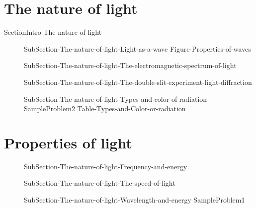 \documentclass[main.tex]{subfiles}
\begin{document}
 
 
\section{The nature of light}{SectionIntro-The-nature-of-light}
\sloppy\begin{description}
\item[]{SubSection-The-nature-of-light-Light-as-a-wave}
{Figure-Properties-of-waves}
\item[]{SubSection-The-nature-of-light-The-electromagnetic-spectrum-of-light}
\vspace{-1cm}{Figure-Electromagnetic-field}
\item[] {SubSection-The-nature-of-light-The-double-slit-experiment-light-diffraction}
\vspace{-1cm}{Figure-Double-slit}
\vspace{0cm}\hspace{-5cm}{Figure-waves-and-life}
\item[] {SubSection-The-nature-of-light-Types-and-color-of-radiation}
\hspace{0cm}\vspace{0cm}{Figure-Electromagnetic-spectra}
{SampleProblem2}
{Table-Types-and-Color-or-radiation}
\end{description}


\section{Properties of light} 
\sloppy\begin{description}
\item[] {SubSection-The-nature-of-light-Frequency-and-energy}
\item[] {SubSection-The-nature-of-light-The-speed-of-light}
\item[] {SubSection-The-nature-of-light-Wavelength-and-energy}
{SampleProblem1}
\end{description}
\end{document}
